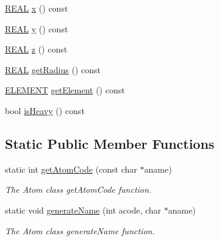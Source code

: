 \begin{DoxyCompactItemize}
\item 
\hyperlink{util_8h_a5821460e95a0800cf9f24c38915cbbde}{R\-E\-A\-L} \hyperlink{classCAtom_a4c911762af7a8abf5fec08d3a896e5df}{x} () const 
\item 
\hyperlink{util_8h_a5821460e95a0800cf9f24c38915cbbde}{R\-E\-A\-L} \hyperlink{classCAtom_a63db481ebb7d5b7d96014d70e020acc2}{y} () const 
\item 
\hyperlink{util_8h_a5821460e95a0800cf9f24c38915cbbde}{R\-E\-A\-L} \hyperlink{classCAtom_ae5ce32de61ffe6f35f7790de5c805bd4}{z} () const 
\item 
\hyperlink{util_8h_a5821460e95a0800cf9f24c38915cbbde}{R\-E\-A\-L} \hyperlink{classCAtom_a07a673af1c8461ed3543b352dc1db7d9}{get\-Radius} () const 
\item 
\hyperlink{classCAtom_a79e729b143961179c43939392d704848}{E\-L\-E\-M\-E\-N\-T} \hyperlink{classCAtom_ae7a0eafdaea94df055fd5fe86bce0404}{get\-Element} () const 
\item 
bool \hyperlink{classCAtom_ac23e0bb6890eac49c8da3f350c1190b3}{is\-Heavy} () const 
\end{DoxyCompactItemize}
\subsection*{Static Public Member Functions}
\begin{DoxyCompactItemize}
\item 
static int \hyperlink{classCAtom_a5208b057db97f1c98b3b8fd973a95412}{get\-Atom\-Code} (const char $\ast$aname)
\begin{DoxyCompactList}\small\item\em The Atom class get\-Atom\-Code function. \end{DoxyCompactList}\item 
static void \hyperlink{classCAtom_ac31a8af47f25e335803afe6d356a0112}{generate\-Name} (int acode, char $\ast$aname)
\begin{DoxyCompactList}\small\item\em The Atom class generate\-Name function. \end{DoxyCompactList}\end{DoxyCompactItemize}
